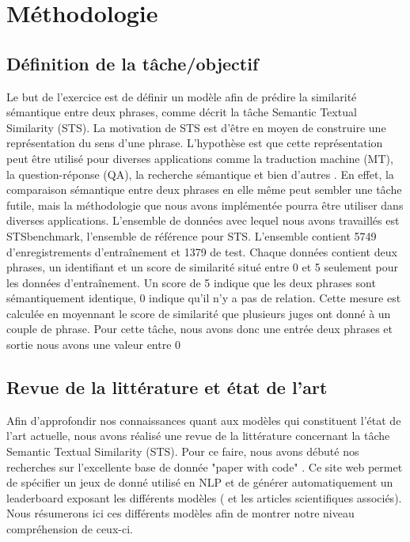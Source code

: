 \documentclass[11pt,a4paper, french]{article}
\begin{document}
%

\section{Méthodologie}


\subsection{Définition de la tâche/objectif}
Le but de l’exercice est de définir un modèle afin de prédire la similarité sémantique entre deux phrases, comme décrit la tâche Semantic Textual Similarity (STS). La motivation de STS est d’être en moyen de construire une représentation du sens d’une phrase. L’hypothèse est que cette représentation peut être utilisé pour diverses applications comme la traduction machine (MT), la question-réponse (QA), la recherche sémantique et bien d’autres \cite{Cer_2017}. En effet, la comparaison sémantique entre deux phrases en elle même peut sembler une tâche futile, mais la méthodologie que nous avons implémentée pourra être utiliser dans diverses applications.
	L’ensemble de données avec lequel nous avons travaillés est STSbenchmark, l’ensemble de référence pour STS. L’ensemble contient 5749 d’enregistrements d'entraînement et 1379 de test. Chaque données contient deux phrases, un identifiant et un score de similarité situé entre 0 et 5 seulement pour les données d'entraînement. Un score de 5 indique que les deux phrases sont sémantiquement identique, 0 indique qu’il n’y a pas de relation. Cette mesure est calculée en moyennant le score de similarité que plusieurs juges ont donné à un couple de phrase. Pour cette tâche, nous avons donc une entrée deux phrases et sortie nous avons une valeur entre 0%

\subsection{Revue de la littérature et état de l'art}
Afin d'approfondir nos connaissances quant aux modèles qui constituent l'état de l'art actuelle, nous avons réalisé une revue de la littérature concernant la tâche Semantic Textual Similarity (STS). Pour ce faire, nous avons débuté nos recherches sur l'excellente base de donnée "paper with code" \cite{sota}. Ce site web permet de spécifier un jeux de donné utilisé en NLP et de générer automatiquement un leaderboard exposant les différents modèles ( et les articles scientifiques associés). Nous résumerons ici ces différents modèles afin de montrer notre niveau compréhension de ceux-ci. 
\end{document}
